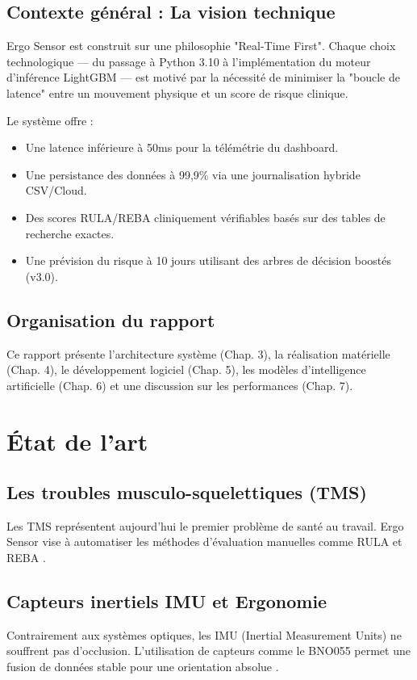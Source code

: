 \documentclass[12pt,a4paper]{report}
\begin{document}
\section{Contexte général : La vision technique}
Ergo Sensor est construit sur une philosophie "Real-Time First". Chaque choix technologique --- du passage à Python 3.10 à l'implémentation du moteur d'inférence LightGBM --- est motivé par la nécessité de minimiser la "boucle de latence" entre un mouvement physique et un score de risque clinique.

Le système offre :
\begin{itemize}
    \item Une latence inférieure à 50ms pour la télémétrie du dashboard.
    \item Une persistance des données à 99,9\% via une journalisation hybride CSV/Cloud.
    \item Des scores RULA/REBA cliniquement vérifiables basés sur des tables de recherche exactes.
    \item Une prévision du risque à 10 jours utilisant des arbres de décision boostés (v3.0).
\end{itemize}

\section{Organisation du rapport}
Ce rapport présente l'architecture système (Chap. 3), la réalisation matérielle (Chap. 4), le développement logiciel (Chap. 5), les modèles d'intelligence artificielle (Chap. 6) et une discussion sur les performances (Chap. 7).

\chapter{État de l'art}
\section{Les troubles musculo-squelettiques (TMS)}
Les TMS représentent aujourd'hui le premier problème de santé au travail. Ergo Sensor vise à automatiser les méthodes d'évaluation manuelles comme RULA \cite{mcatamney1993rula} et REBA \cite{hignett2000reba}.

\section{Capteurs inertiels IMU et Ergonomie}
Contrairement aux systèmes optiques, les IMU (Inertial Measurement Units) ne souffrent pas d'occlusion. L'utilisation de capteurs comme le BNO055 permet une fusion de données stable pour une orientation absolue \cite{vignais2013imu}.
\end{document}
